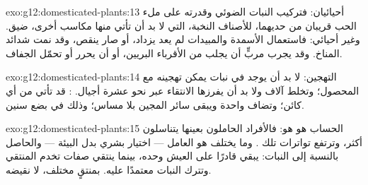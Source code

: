 \begin{solution}{exo:g12:domesticated-plants:13}
أحيائيان: فتركيب النبات الضوئي وقدرته على ملء الحب قريبان من حديهما،
 للأصناف النخبة، التي لا بد أن تأتي منها مكاسب أخرى،
ضيق. وغير أحيائي: فاستعمال الأسمدة والمبيدات لم يعد يزداد، أو صار
ينقص، وقد نمت شدائد المناخ. وقد يجرب مربٍّ أن يجلب  من الأقرباء
البريين، أو أن يحرر   أو تحمّل الجفاف.
\end{solution}

\begin{solution}{exo:g12:domesticated-plants:14}
التهجين: لا بد أن يوجد  في نبات يمكن تهجينه مع المحصول؛ وتخلط
آلاف  ولا بد أن يفرزها الانتقاء عبر نحو عشرة أجيال. : قد تأتي  من أي كائن؛ وتضاف  واحدة ويبقى سائر
المجين بلا مساس؛ وذلك في بضع سنين.
\end{solution}

\begin{solution}{exo:g12:domesticated-plants:15}
الحساب هو هو: فالأفراد الحاملون  بعينها يتناسلون أكثر، وترتفع
تواترات تلك . وما يختلف هو العامل --- اختيار بشري بدل البيئة
--- والحاصل بالنسبة إلى النبات:  يبقي  قادرًا
على العيش وحده، بينما ينتقي  صفات تخدم المنتقي وتترك النبات
معتمدًا عليه.   بمنتقٍ مختلف، لا نقيضه.
\end{solution}

